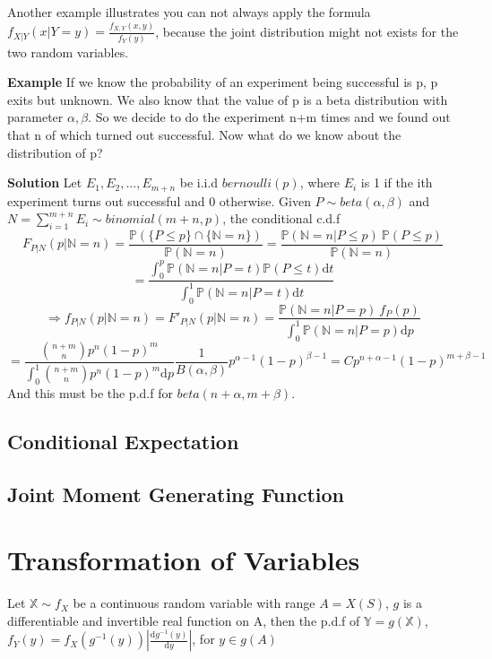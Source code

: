\documentclass[a4paper,12pt]{article}
\begin{document}
Another example illustrates you can not always apply the formula $f_{X|Y}(x|Y=y) = \frac{f_{X,Y}(x, y)}{f_Y(y)}$, because the joint distribution might not exists for the two random variables. 

\textbf{Example} If we know the probability of an experiment being successful is p, p exits but unknown. We also know that the value of p is a beta distribution with parameter $\alpha, \beta$. So we decide to do the experiment n+m times and we found out that n of which turned out successful. Now what do we know about the distribution of p? 

\textbf{Solution}
Let $E_1, E_2, ..., E_{m+n}$ be i.i.d $bernoulli(p)$, where $E_i$ is 1 if the ith experiment turns out successful and 0 otherwise. Given $P \sim beta(\alpha, \beta)$ and $N = \sum_{i=1}^{m+n} E_i \sim binomial(m+n, p)$, the conditional c.d.f 
$$F_{P|N}(p|\mathbb{N}=n) = \frac{\mathbb{P}( \{P \leq p\} \cap \{\mathbb{N} = n\} )}{\mathbb{P}(\mathbb{N} = n)} = \frac{\mathbb{P}( \mathbb{N} = n | P \leq p )\  \mathbb{P}( P \leq p )}{\mathbb{P}(\mathbb{N} = n)} $$
$$= \frac{\int_0^p \mathbb{P} (\mathbb{N} = n | P=t) \mathbb{P}( P \leq t ) \mathrm{d}t }{\int_0^1 \mathbb{P} (\mathbb{N} = n | P=t) \mathrm{d}t }$$
$$\Rightarrow f_{P|N}(p|\mathbb{N}=n) = F'_{P|N}(p|\mathbb{N}=n) =   \frac{\mathbb{P} (\mathbb{N} = n | P=p)\ f_P(p)}{\int_0^1 \mathbb{P} (\mathbb{N} = n | P=p) \mathrm{d}p }$$
$$= \frac{ {n+m \choose n}p^n(1-p)^m }{\int_0^1{ n+m \choose n}p^n(1-p)^m\mathrm{d}p}\frac{1}{B(\alpha,	\beta)} p^{\alpha-1} (1-p)^{\beta-1} = C p^{n+\alpha-1} (1-p)^{m+\beta-1}$$
And this must be the p.d.f for $beta(n+\alpha, m+\beta )$.

\subsection{Conditional Expectation}

\subsection{Joint Moment Generating Function}

\newpage
\section{Transformation of Variables}
Let $\mathbb{X} \sim f_X$ be a continuous random variable with range $A = X(S)$, $g$ is a differentiable and invertible real function on A, then the p.d.f of $\mathbb{Y} = g(\mathbb{X})$, $f_Y(y) = f_X(g^{-1}(y)) |\frac{\mathrm{d}g^{-1}(y)}{\mathrm{d}y} |$, for $y\in g(A)$
\end{document}
